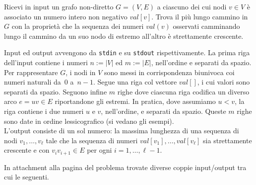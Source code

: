 \renewcommand{\nomebreve}{LIP}
\renewcommand{\titolo}{Longest Increasing Path in a graph}

\introduzione{}

\noindent
Ricevi in input un grafo non-diretto $G=(V,E)$ a ciascuno dei cui nodi $v\in V$ è associato un numero intero non negativo $val[v]$. Trova il più lungo cammino in $G$ con la proprietà che la sequenza dei numeri $val(v)$ osservati camminando lungo il cammino da un suo nodo di estremo all'altro è strettamente crescente.



Input ed output avvengono da \verb'stdin' e su \verb'stdout' rispettivamente.
La prima riga dell'input contiene i numeri $n:=|V|$ ed $m:=|E|$, nell'ordine e separati da spazio. Per rappresentare $G$, i nodi in $V$ sono messi in corrispondenza biunivoca coi numeri naturali da~$0$ a~$n-1$.
Segue una riga col vettore $val[]$, i cui valori sono separati da spazio.
Seguono infine $m$ righe dove ciascuna riga codifica un diverso arco $e=uv\in E$ riportandone gli estremi. In pratica, dove assumiamo $u < v$, la riga contiene i due numeri $u$ e $v$, nell'ordine, e separati da spazio.
Queste $m$ righe sono date in ordine lessicografico (si vedano gli esempi).\\

L'output consiste di un sol numero: la massima lunghezza di una sequenza di nodi $v_1, \ldots, v_\ell$ tale che la sequenza di numeri $val[v_1], \ldots, val[v_\ell]$ sia strettamente crescente e con $v_iv_{i+1}\in E$ per ogni $i=1, \ldots, \ell-1$.



In attachment alla pagina del problema trovate diverse coppie input/output tra cui le seguenti.

\vspace{0.5cm}

